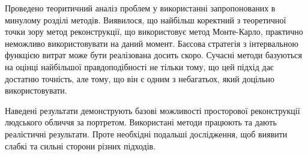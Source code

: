 \chapterConclusion

Проведено теоритичний аналіз проблем
у використанні запропонованих в минулому розділі методів.
Виявилося, що найбільш коректний з теоретичної точки зору
метод реконструкції, що використовує метод Монте-Карло,
практично неможливо використовувати на даний момент.
Баєсова стратегія з інтервальною функцією витрат
може бути реалізована досить скоро.
Сучасні методи базуються на
оцінці найбільшої правдоподібності
не тільки тому, що цей підхід дає достатню точність,
але тому, що він є одним з небагатьох, який доцільно використовувати.

Наведені результати демонструють базові можливості
просторової реконструкції людського обличчя за портретом.
Використані методи працюють та дають реалістичні результати.
Проте необхідні подальші дослідження,
щоб виявити слабкі та сильні сторони різних підходів.
